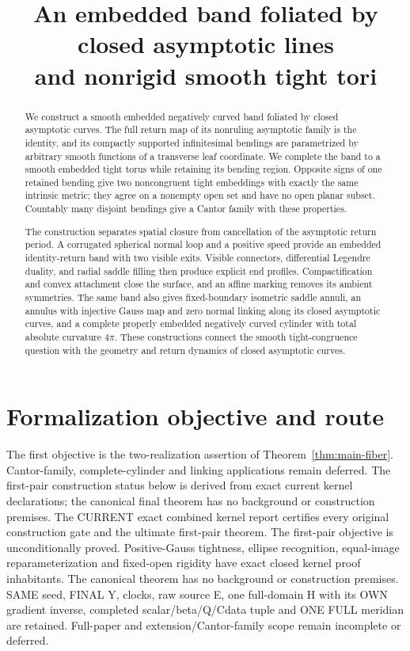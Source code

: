 \documentclass[11pt]{amsart}
\title[Closed asymptotic bands and tight tori]{An embedded band foliated by closed asymptotic lines\\and nonrigid smooth tight tori}
\author{}
\date{}
\theoremstyle{definition}
\theoremstyle{remark}
\numberwithin{equation}{section}
\begin{document}
\begin{abstract}
We construct a smooth embedded negatively curved band foliated by closed
asymptotic curves. The full return map of its nonruling asymptotic family
is the identity, and its compactly supported infinitesimal bendings are
parametrized by arbitrary smooth functions of a transverse leaf coordinate.
We complete the band to a smooth embedded tight torus while retaining
its bending region. Opposite signs of one retained bending give two
noncongruent tight embeddings with exactly the same intrinsic metric;
they agree on a nonempty open set and have no open planar subset.
Countably many disjoint bendings give a Cantor family with these properties.

The construction separates spatial closure from cancellation of the
asymptotic return period. A corrugated spherical normal loop and a
positive speed provide an embedded identity-return band with two visible
exits. Visible connectors, differential Legendre duality, and radial
saddle filling then produce explicit end profiles. Compactification and
convex attachment close the surface, and an affine marking removes its
ambient symmetries. The same band also gives fixed-boundary isometric
saddle annuli, an annulus with injective Gauss map and zero normal
linking along its closed asymptotic curves, and a complete properly
embedded negatively curved cylinder with total absolute curvature $4\pi$.
These constructions connect the smooth tight-congruence question with
the geometry and return dynamics of closed asymptotic curves.
\end{abstract}
\maketitle
\section*{Formalization objective and route}
The first objective is the two-realization assertion of Theorem~\ref{thm:main-fiber}. Cantor-family, complete-cylinder and linking applications remain deferred. The first-pair construction status below is derived from exact current kernel declarations; the canonical final theorem has no background or construction premises.
The CURRENT exact combined kernel report certifies every original construction gate and the ultimate first-pair theorem. The first-pair objective is unconditionally proved. Positive-Gauss tightness, ellipse recognition, equal-image reparameterization and fixed-open rigidity have exact closed kernel proof inhabitants. The canonical theorem has no background or construction premises. SAME seed, FINAL Y, clocks, raw source E, one full-domain H with its OWN gradient inverse, completed scalar/beta/Q/Cdata tuple and ONE FULL meridian are retained. Full-paper and extension/Cantor-family scope remain incomplete or deferred.
\end{document}
